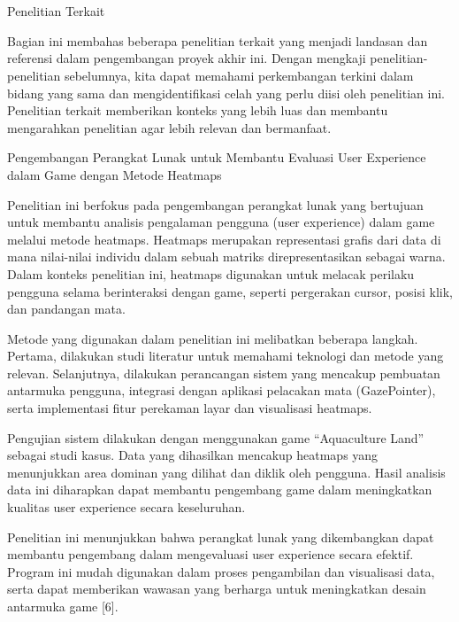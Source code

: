 \chapter{\babDua}
\label{bab:2}
Penelitian Terkait

Bagian ini membahas beberapa penelitian terkait yang menjadi landasan dan referensi dalam pengembangan proyek akhir ini. Dengan mengkaji penelitian-penelitian sebelumnya, kita dapat memahami perkembangan terkini dalam bidang yang sama dan mengidentifikasi celah yang perlu diisi oleh penelitian ini. Penelitian terkait memberikan konteks yang lebih luas dan membantu mengarahkan penelitian agar lebih relevan dan bermanfaat.

Pengembangan Perangkat Lunak untuk Membantu Evaluasi User Experience dalam Game dengan Metode Heatmaps

Penelitian ini berfokus pada pengembangan perangkat lunak yang bertujuan untuk membantu analisis pengalaman pengguna (user experience) dalam game melalui metode heatmaps. Heatmaps merupakan representasi grafis dari data di mana nilai-nilai individu dalam sebuah matriks direpresentasikan sebagai warna. Dalam konteks penelitian ini, heatmaps digunakan untuk melacak perilaku pengguna selama berinteraksi dengan game, seperti pergerakan cursor, posisi klik, dan pandangan mata.

Metode yang digunakan dalam penelitian ini melibatkan beberapa langkah. Pertama, dilakukan studi literatur untuk memahami teknologi dan metode yang relevan. Selanjutnya, dilakukan perancangan sistem yang mencakup pembuatan antarmuka pengguna, integrasi dengan aplikasi pelacakan mata (GazePointer), serta implementasi fitur perekaman layar dan visualisasi heatmaps.

Pengujian sistem dilakukan dengan menggunakan game “Aquaculture Land” sebagai studi kasus. Data yang dihasilkan mencakup heatmaps yang menunjukkan area dominan yang dilihat dan diklik oleh pengguna. Hasil analisis data ini diharapkan dapat membantu pengembang game dalam meningkatkan kualitas user experience secara keseluruhan.

Penelitian ini menunjukkan bahwa perangkat lunak yang dikembangkan dapat membantu pengembang dalam mengevaluasi user experience secara efektif. Program ini mudah digunakan dalam proses pengambilan dan visualisasi data, serta dapat memberikan wawasan yang berharga untuk meningkatkan desain antarmuka game [6].

